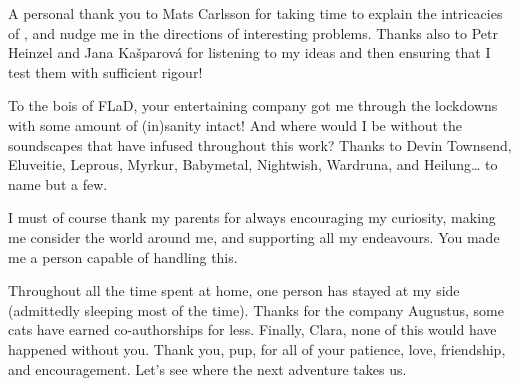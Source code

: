 A personal thank you to Mats Carlsson for taking time to explain the intricacies of \Radyn{}, and nudge me in the directions of interesting problems.
Thanks also to Petr Heinzel and Jana Kašparová for listening to my ideas and then ensuring that I test them with sufficient rigour!

To the bois of FLaD, your entertaining company got me through the lockdowns with some amount of (in)sanity intact!
And where would I be without the soundscapes that have infused throughout this work?
Thanks to Devin Townsend, Eluveitie, Leprous, Myrkur, Babymetal, Nightwish, Wardruna, and Heilung\dots{} to name but a few.

I must of course thank my parents for always encouraging my curiosity, making me consider the world around me, and supporting all my endeavours.
You made me a person capable of handling this.

Throughout all the time spent at home, one person has stayed at my side (admittedly sleeping most of the time).
Thanks for the company Augustus, some cats have earned co-authorships for less.
Finally, Clara, none of this would have happened without you.
Thank you, pup, for all of your patience, love, friendship, and encouragement.
Let's see where the next adventure takes us.